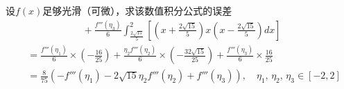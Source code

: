 \documentclass[11pt]{article}
\begin{document}
\begin{question}
\begin{subquestion}{设$f(x)$足够光滑（可微），求该数值积分公式的误差}
{\begin{align*}
                       & \phantom{1+1+1+1} + \frac{f'''(\eta_3)}{6}\int_{\frac{2\sqrt{15}}{5}}^{2}{\left[\left(x + \frac{2\sqrt{15}}{5}\right)x\left(x - \frac{2\sqrt{15}}{5}\right)dx\right]}                                                                                                   \\
                       & = \frac{f'''(\eta_1)}{6} \times \left(- \frac{16}{25}\right) + \frac{\eta_2f'''(\eta_2)}{6} \times \left(-\frac{32\sqrt{15}}{25}\right) + \frac{f'''(\eta_3)}{6} \times \frac{16}{25}                                                                                   \\
                       & = \frac{8}{75}\left(- f'''(\eta_1) - 2\sqrt{15}\eta_2f'''(\eta_2) + f'''(\eta_3) \right),\quad \eta_1,\, \eta_2,\, \eta_3 \in [-2, 2]
            \end{align*}
        }
    \end{subquestion}
\end{question}
\end{document}
